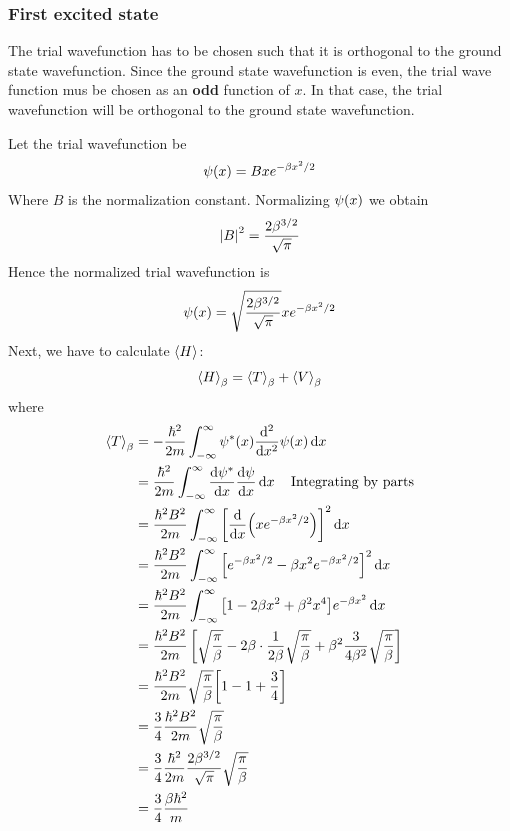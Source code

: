 	
	\subsubsection{First excited state}
	
	The trial wavefunction has to be chosen such that it is orthogonal to the ground state wavefunction. Since the ground state wavefunction is even, the trial wave function mus be chosen as an \textbf{odd} function of $x$. In that case, the trial wavefunction will be orthogonal to the ground state wavefunction.
	
	Let the trial wavefunction be
	\begin{align}
		\psi\qty(x) = B x e^{-\beta x^2/2}
	\end{align}
	Where $B$ is the normalization constant. Normalizing $\psi\qty(x)$ we obtain
	\begin{align}
		\abs{B}^2 = \frac{2 \beta^{3/2}}{\sqrt{\pi}}
	\end{align}
	Hence the normalized trial wavefunction is
	\begin{align}
		\psi\qty(x) = \sqrt{\frac{2 \beta^{3/2}}{\sqrt{\pi}}} x e^{-\beta x^2/2}
	\end{align}
	Next, we have to calculate $\expval{H}$:
	\begin{align}
		\expval{H}_\beta = \expval{T}_\beta + \expval{V}_\beta
	\end{align}
	where
	\begin{align*}
		\expval{T}_\beta 
		&= - \frac{\hbar^2}{2 m} \int_{-\infty}^{\infty} \psi^*\qty(x) \dv[2]{}{x} \psi\qty(x) \dd{x}\\
		&= \frac{\hbar^2}{2 m} \int_{-\infty}^{\infty} \dv{\psi^*}{x} \dv{\psi}{x} \dd{x} \quad \text{Integrating by parts}\\
		&= \frac{\hbar^2 B^2}{2 m} \int_{-\infty}^{\infty} \qty[\dv{}{x} \qty(x e^{-\beta x^2/2})]^2 \dd{x}\\
		&= \frac{\hbar^2 B^2}{2 m} \int_{-\infty}^{\infty} \qty[e^{-\beta x^2/2} - \beta x^2 e^{-\beta x^2/2}]^2 \dd{x} \\
		&= 	\frac{\hbar^2 B^2}{2 m} \int_{-\infty}^{\infty} \qty[1 - 2\beta x^2 + \beta^2 x^4] e^{-\beta x^2} \dd{x} \\
		&= \frac{\hbar^2 B^2}{2 m} \left[
		\sqrt{\frac{\pi}{\beta}} - 2 \beta \cdot \frac{1}{2\beta} \sqrt{\frac{\pi}{\beta}}  + \beta^2 \frac{3}{4 \beta^2} \sqrt{\frac{\pi}{\beta}} 
		\right] \\
		&= \frac{\hbar^2 B^2}{2 m} \sqrt{\frac{\pi}{\beta}} \qty[1 - 1 + \frac{3}{4}] \\
		&= \frac{3}{4} \frac{\hbar^2 B^2}{2 m} \sqrt{\frac{\pi}{\beta}} \\
		&= \frac{3}{4} \frac{\hbar^2}{2 m} \frac{2 \beta^{3/2}}{\sqrt{\pi}}  \sqrt{\frac{\pi}{\beta}} \\
		&= \frac{3}{4} \frac{\beta \hbar^2}{m}
	\end{align*}
